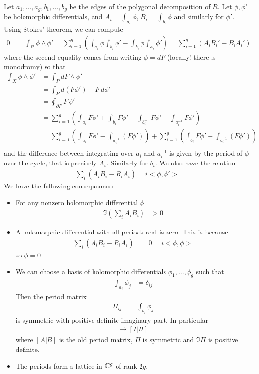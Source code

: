 \documentclass[12pt]{article}
\begin{document}
Let $a_1, \ldots, a_g, b_1, \ldots, b_g$ be the edges of the polygonal decomposition of $R$. Let $\phi, \phi'$ be holomorphic differentials, and $A_i = \int_{a_i} \phi$, $B_i = \int_{b_i} \phi$ and similarly for $\phi'$. Using Stokes' theorem, we can compute \begin{align*}
    0 & = \int_R \phi \wedge \phi' = \sum_{i=1}^g \left( \int_{a_i} \phi \int_{b_i} \phi' - \int_{b_i} \phi \int_{a_i} \phi' \right) = \sum_{i=1}^g (A_i B_i' - B_i A_i')
\end{align*} where the second equality comes from writing $\phi = dF$ (locally! there is monodromy) so that \begin{align*}
    \int_X \phi \wedge \phi' &= \int_P dF\wedge\phi' \\
    &= \int_P d(F\phi')-F\,d\phi' \\
&= \oint_{\partial P} F\,\phi' \\
&= \sum_{i=1}^g \left( \int_{a_i} F\phi' + \int_{b_i} F\phi' - \int_{b_i^{-1}} F\phi' - \int_{a_i^{-1}} F\phi' \right) \\
&= \sum_{i=1}^g \left( \int_{a_i}F\phi' - \int_{a_i^{-1}} (F\phi') \right) + \sum_{i=1}^g \left( \int_{b_i} F\phi' - \int_{b_i^{-1}} (F\phi') \right) \\
\end{align*} and the difference between integrating over $a_i$ and $a_i^{-1}$ is given by the period of $\phi$ over the cycle, that is precisely $A_i$. Similarly for $b_i$.
We also have the relation \begin{align*}
    \sum_i (A_i \overline{B_i} - B_i \overline{A_i}) = i<\phi, \phi'> 
\end{align*} 
We have the following consequences:
\begin{itemize}
    \item For any nonzero holomorphic differential $\phi$
\begin{align*}
    \Im( \sum _i A_i \overline{B_i} ) & > 0
\end{align*} 
\item A holomorphic differential with all periods real is zero. This is because \begin{align*}
    \sum_i (A_i \overline{B_i} - B_i \overline{A_i}) & = 0 = i<\phi, \phi>
\end{align*} so $\phi = 0$.
\item We can choose a basis of holomorphic differentials $\phi_1, \ldots, \phi_g$ such that \begin{align*}
    \int_{a_i} \phi_j & = \delta_{ij}
\end{align*} Then the period matrix \begin{align*}
    \Pi_{ij} & = \int_{b_i} \phi_j
\end{align*} is symmetric with positive definite imaginary part. In particular \begin{align*}
    [A | B] \to [I | \Pi]
\end{align*} where $[A|B]$ is the old period matrix, $\Pi$ is symmetric and $\Im \Pi$ is positive definite.
\item The periods form a lattice in $\mathbb{C}^g$ of rank $2g$.
\end{itemize} 
\end{document}
